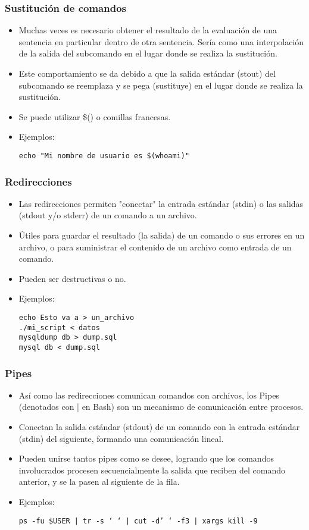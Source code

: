 \begin{frame}[fragile]
  \frametitle{Sustitución de comandos}
  \begin{itemize}
	  \item Muchas veces es necesario obtener el resultado de la evaluación de una sentencia en particular dentro de otra sentencia. Sería como una interpolación de la salida del subcomando en el lugar donde se realiza la sustitución.
	  \item Este comportamiento se da debido a que la salida estándar (stout) del subcomando se reemplaza y se pega (sustituye) en el lugar donde se realiza la sustitución.
    \item Se puede utilizar \$() o comillas francesas.
    \item Ejemplos:
		\begin{lstlisting}
echo "Mi nombre de usuario es $(whoami)"
		\end{lstlisting}
  \end{itemize}
\end{frame}

\begin{frame}[fragile]
  \frametitle{Redirecciones}
  \begin{itemize}
	  \item Las redirecciones permiten "conectar" la entrada estándar (stdin) o las salidas (stdout y/o stderr) de un comando a un archivo.
	  \item Útiles para guardar el resultado (la salida) de un comando o sus errores en un archivo, o para suministrar el contenido de un archivo como entrada de un comando.
    \item Pueden ser destructivas o no.
    \item Ejemplos:
		\begin{lstlisting}
echo Esto va a > un_archivo
./mi_script < datos
mysqldump db > dump.sql
mysql db < dump.sql
		\end{lstlisting}
  \end{itemize}
\end{frame}

\begin{frame}[fragile]
  \frametitle{Pipes}
  \begin{itemize}
	  \item Así como las redirecciones comunican comandos con archivos, los Pipes (denotados con | en Bash) son un mecanismo de comunicación entre procesos.
	  \item Conectan la salida estándar (stdout) de un comando con la entrada estándar (stdin) del siguiente, formando una comunicación lineal.
    \item Pueden unirse tantos pipes como se desee, logrando que los comandos involucrados procesen secuencialmente la salida que reciben del comando anterior, y se la pasen al siguiente de la fila.
    \item Ejemplos:
		\begin{lstlisting}
ps -fu $USER | tr -s ‘ ‘ | cut -d’ ‘ -f3 | xargs kill -9
		\end{lstlisting}
  \end{itemize}
\end{frame}

